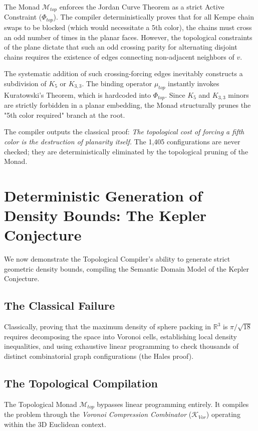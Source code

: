 \documentclass[12pt,openany]{extbook}
\theoremstyle{plain}
\theoremstyle{definition}
\begin{document}
The Monad $\mathcal{M}_{top}$ enforces the Jordan Curve Theorem as a strict Active Constraint ($\Phi_{top}$). The compiler deterministically proves that for all Kempe chain swaps to be blocked (which would necessitate a 5th color), the chains must cross an odd number of times in the planar faces. However, the topological constraints of the plane dictate that such an odd crossing parity for alternating disjoint chains requires the existence of edges connecting non-adjacent neighbors of $v$.

The systematic addition of such crossing-forcing edges inevitably constructs a subdivision of $K_5$ or $K_{3,3}$. The binding operator $\mu_{top}$ instantly invokes Kuratowski's Theorem, which is hardcoded into $\Phi_{top}$. Since $K_5$ and $K_{3,3}$ minors are strictly forbidden in a planar embedding, the Monad structurally prunes the "5th color required" branch at the root.

The compiler outputs the classical proof: \emph{The topological cost of forcing a fifth color is the destruction of planarity itself.} The 1,405 configurations are never checked; they are deterministically eliminated by the topological pruning of the Monad.

\section{Deterministic Generation of Density Bounds: The Kepler Conjecture}

We now demonstrate the Topological Compiler's ability to generate strict geometric density bounds, compiling the Semantic Domain Model of the Kepler Conjecture.

\subsection{The Classical Failure}
Classically, proving that the maximum density of sphere packing in $\mathbb{R}^3$ is $\pi/\sqrt{18}$ requires decomposing the space into Voronoi cells, establishing local density inequalities, and using exhaustive linear programming to check thousands of distinct combinatorial graph configurations (the Hales proof).

\subsection{The Topological Compilation}
The Topological Monad $\mathcal{M}_{top}$ bypasses linear programming entirely. It compiles the problem through the \emph{Voronoi Compression Combinator} ($\mathcal{K}_{Vor}$) operating within the 3D Euclidean context.
\end{document}
